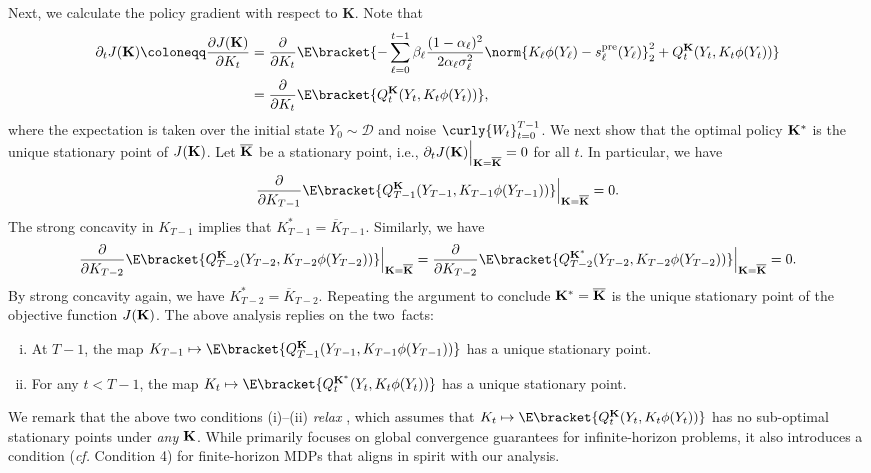\documentclass{article}
\begin{document}
Next, we calculate the policy gradient with respect to $ \mathbf{K} $. Note that
\begin{align}
    \partial_{t}J({\bf K}) \coloneqq \frac{\partial J({\bf K})}{\partial K_t} & = \frac{\partial}{\partial K_{t}} \E\bracket{-\sum_{\ell = 0}^{t-1}\beta_{\ell}\frac{(1 - \alpha_\ell)^{2}}{2\alpha_{\ell}\sigma_{\ell}^{2}}\norm{K_{\ell}\phi(Y_{\ell}) - s_{\ell}^{\rm pre}(Y_{\ell})}_{2}^{2} + Q_{t}^{\bf K}(Y_{t}, K_{t}\phi(Y_{t}))} \nonumber \\ & = \frac{\partial}{\partial K_{t}} \E\bracket{Q_{t}^{\bf K}(Y_{t}, K_{t}\phi(Y_{t}))}, \label{eq:policy-gradient}
\end{align}
where the expectation is taken over the initial state $ Y_{0}\sim\mathcal{D}$ and noise $ \curly{W_{t}}_{t=0}^{T-1} $. We next show that the optimal policy $ \bf K^{*} $ is the unique stationary point of $ J(\bf K) $. Let $ \overline{\bf K} $ be a stationary point, i.e., $ \partial_{t}J({\bf K}) \Big\vert_{\bf K = \overline{\bf K}} = 0 $ for all $ t  $. In particular, we have 
\begin{align*}
    \frac{\partial}{\partial K_{T-1}} \E\bracket{Q_{T-1}^{\bf K}(Y_{T-1}, K_{T-1}\phi(Y_{T-1}))} \Big\vert_{\bf K = \overline{\bf K}}= 0.
\end{align*}
The strong concavity in $ K_{T-1} $ implies that $ K_{T - 1}^{*} = \overline{K}_{T - 1}$. Similarly, we have
\begin{align*}
    \frac{\partial}{\partial K_{T-2}} \E\bracket{Q_{T-2}^{\bf K}(Y_{T-2}, K_{T-2}\phi(Y_{T-2}))} \Big\vert_{\bf K = \overline{\bf K}}= \frac{\partial}{\partial K_{T-2}} \E\bracket{Q_{T-2}^{\bf K^{*}}(Y_{T-2}, K_{T-2}\phi(Y_{T-2}))} \Big\vert_{\bf K = \overline{\bf K}}= 0.
\end{align*}
By strong concavity again, we have $  K_{T - 2}^{*} =\overline{K}_{T - 2} $. Repeating the argument to conclude $  {\bf K}^{*}=\overline{\bf K}  $ is the unique stationary point of the objective function $J(\bf K)$. 
%
The above analysis replies on the two~facts:
\begin{enumerate}[(i)]
    \item At $ T - 1 $, the map $ K_{T-1} \mapsto \E\bracket{Q_{T-1}^{\bf K}(Y_{T-1}, K_{T-1}\phi(Y_{T-1}))} $ has a unique stationary point. 
    \item For any $ t < T - 1 $, the map $ K_{t} \mapsto \E\bracket{Q_{t}^{\bf K^{*}}(Y_{t}, K_{t}\phi(Y_{t}))} $ has a unique stationary point. 
\end{enumerate}
We remark that the above two conditions (i)--(ii) {\it relax}  \cite[Assumption 2.A]{bhandari2024global}, which assumes that $ K_{t} \mapsto \E\bracket{Q_{t}^{\bf K}(Y_{t}, K_{t}\phi(Y_{t}))} $ has no sub-optimal stationary points under {\it any} $ \bf K $. While \cite{bhandari2024global} primarily focuses on global convergence guarantees for infinite-horizon problems, it also introduces a condition ({\it cf.} Condition 4) for finite-horizon MDPs that aligns in spirit with our analysis. 
%
\end{document}
